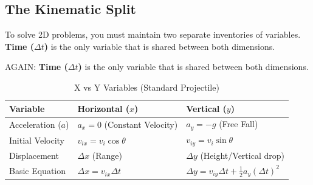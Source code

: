 \documentclass{article}
\begin{document}
\subsection{The Kinematic Split}
To solve 2D problems, you must maintain two separate inventories of variables. \textbf{Time ($\Delta t$)} is the only variable that is shared between both dimensions.

AGAIN: \textbf{Time ($\Delta t$)} is the only variable that is shared between both dimensions.

\begin{table}[h]
  \centering
  \caption{X vs Y Variables (Standard Projectile)}
  \begin{tabular}{lll}
    \toprule
    \textbf{Variable} & \textbf{Horizontal ($x$)} & \textbf{Vertical ($y$)} \\ \midrule
    Acceleration ($a$) & $a_x = 0$ (Constant Velocity) & $a_y = -g$ (Free Fall) \\
    Initial Velocity & $v_{ix} = v_i \cos \theta$ & $v_{iy} = v_i \sin \theta$ \\
    Displacement & $\Delta x$ (Range) & $\Delta y$ (Height/Vertical drop) \\
    Basic Equation & $\Delta x = v_{ix} \Delta t$ & $\Delta y = v_{iy} \Delta t + \frac{1}{2} a_y (\Delta t)^2$ \\ \bottomrule
  \end{tabular}
\end{table}

\newpage
\end{document}
